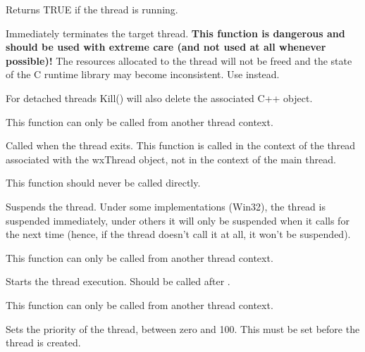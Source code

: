 
Returns TRUE if the thread is running.

\label{wxthreadkill}


Immediately terminates the target thread. {\bf This function is dangerous and should
be used with extreme care (and not used at all whenever possible)!} The resources
allocated to the thread will not be freed and the state of the C runtime library
may become inconsistent. Use  instead.

For detached threads Kill() will also delete the associated C++ object.

This function can only be called from another thread context.

\label{wxthreadonexit}


Called when the thread exits. This function is called in the context of the thread
associated with the wxThread object, not in the context of the main thread.

This function should never be called directly.

\label{wxthreadpause}


Suspends the thread. Under some implementations (Win32), the thread is
suspended immediately, under others it will only be suspended when it calls 
 for the next time (hence, if the
thread doesn't call it at all, it won't be suspended).

This function can only be called from another thread context.

\label{wxthreadrun}


Starts the thread execution. Should be called after 
.

This function can only be called from another thread context.

\label{wxthreadsetpriority}


Sets the priority of the thread, between zero and 100. This must be set before the thread is created.

